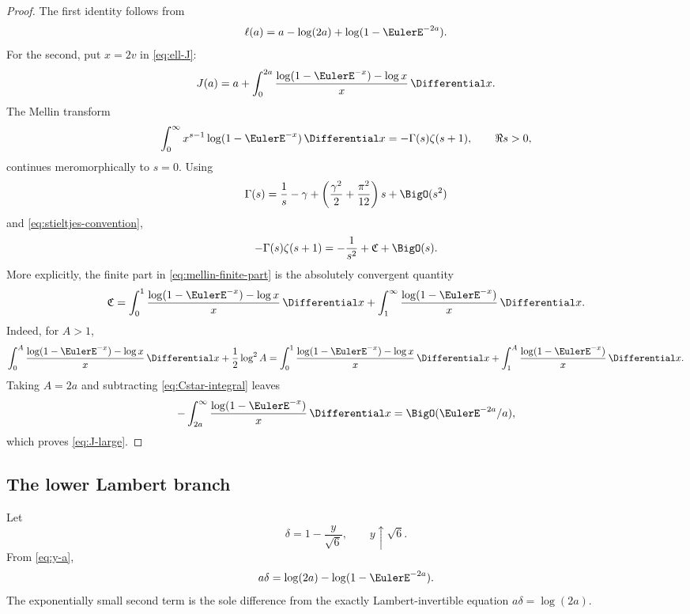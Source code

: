 \documentclass[11pt]{article}
\numberwithin{equation}{section}
\theoremstyle{definition}
\begin{document}
\begin{proof}
The first identity follows from
\[
 \ell(a)=a-\log(2a)+\log(1-\EulerE^{-2a}).
\]
For the second, put \(x=2v\) in \eqref{eq:ell-J}:
\begin{equation}\label{eq:J-renormalized}
 J(a)=a+\int_0^{2a}\frac{\log(1-\EulerE^{-x})-\log x}{x}\,\Differential x.
\end{equation}
The Mellin transform
\begin{equation}\label{eq:mellin-log1mexp}
 \int_0^\infty x^{s-1}\log(1-\EulerE^{-x})\,\Differential x
 =-\Gamma(s)\zeta(s+1),\qquad \Re s>0,
\end{equation}
continues meromorphically to \(s=0\).  Using
\[
 \Gamma(s)=\frac1s-\gamma+
 \left(\frac{\gamma^2}{2}+\frac{\pi^2}{12}\right)s+\BigO(s^2)
\]
and \eqref{eq:stieltjes-convention},
\begin{equation}\label{eq:mellin-finite-part}
 -\Gamma(s)\zeta(s+1)
 =-\frac1{s^2}+\mathfrak C+\BigO(s).
\end{equation}
More explicitly, the finite part in \eqref{eq:mellin-finite-part} is the absolutely convergent quantity
\begin{equation}\label{eq:Cstar-integral}
 \mathfrak C=
 \int_0^1\frac{\log(1-\EulerE^{-x})-\log x}{x}\,\Differential x
 +\int_1^\infty\frac{\log(1-\EulerE^{-x})}{x}\,\Differential x.
\end{equation}
Indeed, for \(A>1\),
\[
 \int_0^A\frac{\log(1-\EulerE^{-x})-\log x}{x}\,\Differential x
 +\frac12\log^2A
 =\int_0^1\frac{\log(1-\EulerE^{-x})-\log x}{x}\,\Differential x
 +\int_1^A\frac{\log(1-\EulerE^{-x})}{x}\,\Differential x.
\]
Taking \(A=2a\) and subtracting \eqref{eq:Cstar-integral} leaves
\[
 -\int_{2a}^\infty\frac{\log(1-\EulerE^{-x})}{x}\,\Differential x
 =\BigO(\EulerE^{-2a}/a),
\]
which proves \eqref{eq:J-large}.
\end{proof}

\subsection{The lower Lambert branch}
Let
\begin{equation}\label{eq:delta-edge}
 \delta=1-\frac{y}{\sqrt6},\qquad y\uparrow\sqrt6.
\end{equation}
From \eqref{eq:y-a},
\begin{equation}\label{eq:delta-a-exact}
 a\delta=\log(2a)-\log(1-\EulerE^{-2a}).
\end{equation}
The exponentially small second term is the sole difference from the exactly Lambert-invertible equation \(a\delta=\log(2a)\).
\end{document}
